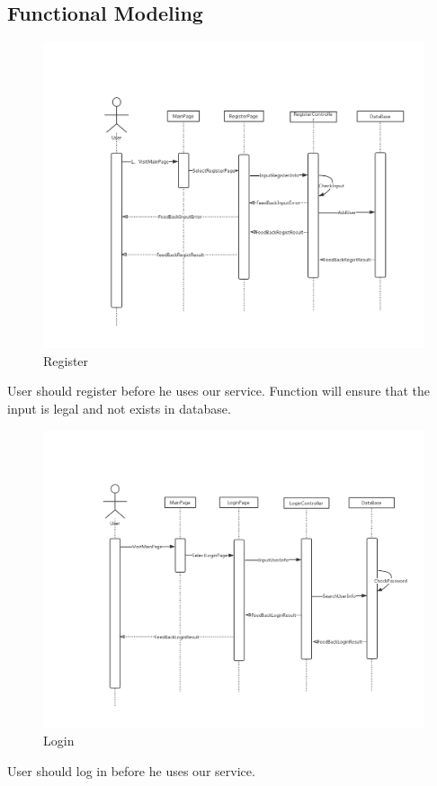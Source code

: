 \documentclass[16pt]{scrreprt}
\begin{document}
\subsection{Functional Modeling}
\begin{figure}[H]
    \includegraphics[width=\linewidth]{./FuncPhoto/1.png}   
    \caption{Register}
\end{figure}
User should register before he uses our service. Function will ensure that the input is legal and not exists in database.

\begin{figure}[H]
    \includegraphics[width=\linewidth]{./FuncPhoto/2.png}   
    \caption{Login}
\end{figure}
User should log in before he uses our service. 
\end{document}
